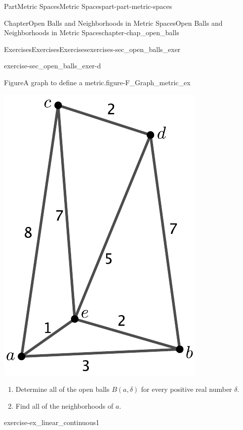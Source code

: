 \documentclass[oneside,10pt,]{book}
\numberwithin{equation}{chapter}
\begin{document}
\begin{partptx}{Part}{Metric Spaces}{}{Metric Spaces}{}{}{part-part-metric-spaces}
\begin{chapterptx}{Chapter}{Open Balls and Neighborhoods in Metric Spaces}{}{Open Balls and Neighborhoods in Metric Spaces}{}{}{chapter-chap_open_balls}
\begin{exercises-section}{Exercises}{Exercises}{}{Exercises}{}{}{exercises-sec_open_balls_exer}
\begin{divisionexercise}{4}{}{}{exercise-sec_open_balls_exer-d}
\begin{figureptx}{Figure}{A graph to define a metric.}{figure-F_Graph_metric_ex}{}
\begin{image}{0.325}{0.35}{0.325}{}
\includegraphics[width=\linewidth]{external/Graph_metric.pdf}
\end{image}%
\tcblower
\end{figureptx}%
\begin{enumerate}[font=\bfseries,label=(\alph*),ref=\alph*]%
\item{}Determine all of the open balls \(B(a,\delta)\) for every positive real number \(\delta\).%
\item{}Find all of the neighborhoods of \(a\).%
\end{enumerate}%
\end{divisionexercise}%
\begin{divisionexercise}{5}{}{}{exercise-ex_linear_continuous1}%
\begin{enumerate}[font=\bfseries,label=(\alph*),ref=\alph*]%

\end{enumerate}
\end{divisionexercise}
\end{exercises-section}
\end{chapterptx}
\end{partptx}
\end{document}
